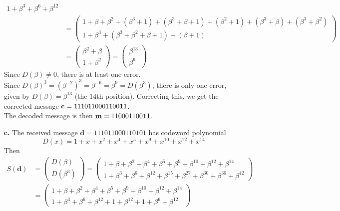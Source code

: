\documentclass[11pt]{article}
\renewcommand{\vec}[1]{\mathbf{#1}}
\newcommand{\vc}[1]{\begin{pmatrix}#1\end{pmatrix}}
\begin{document}
\begin{itemize}
\begin{align*}
{                                      1 + \beta^3 + \beta^6 + \beta^{12}}\\
                               &= \vc{1 + \beta   + \beta^2 + (\beta^3+1)+ (\beta^3+\beta+1) + (\beta^2+1) + (\beta^3 + \beta) + (\beta^3 + \beta^2)\\
                                      1 + \beta^3 + (\beta^3+\beta^2+\beta+1) + (\beta+1)}\\
                               &= \vc{\beta^2+\beta\\
                                      1 + \beta^2}
                                = \vc{\beta^{13}\\
                                      \beta^9}
                   \end{align*}
                   Since $D(\beta)\neq 0$, there is at least one error.\\
                   Since $D(\beta)^3 = (\beta^{-2})^3 = \beta^{-6} = \beta^9 = D(\beta^3)$,
                   there is only one error, given by $D(\beta) = \beta^{13}$ (the 14th position).
                   Correcting this, we get the corrected message
                   $\vec{c} = \text{1110110001100\textbf{1}1}$.\\
                   The decoded  message is then $\vec{m} = \text{110001100\textbf{1}1}$.
      \item[{\bf c.}] The received message      $\vec{d} = \text{111011000110101}$
                   has codeword polynomial
                   \[
                     D(x) = 1 + x + x^2 + x^4 + x^5 + x^9 + x^{10} + x^{12} + x^{14}
                   \]
                   Then
                   \begin{align*}
                     S(\vec{d})&= \vc{D(\beta)\\
                                      D(\beta^3)}
                                = \vc{1 + \beta   + \beta^2 + \beta^4    + \beta^5    + \beta^9    + \beta^{10} + \beta^{12} + \beta^{14} \\
                                      1 + \beta^3 + \beta^6 + \beta^{12} + \beta^{15} + \beta^{27} + \beta^{30} + \beta^{36} + \beta^{42}}\\
                               &= \vc{1 + \beta   + \beta^2 + \beta^4    + \beta^5    + \beta^9    + \beta^{10} + \beta^{12} + \beta^{14} \\
                                      1 + \beta^3 + \beta^6 + \beta^{12} +    1       + \beta^{12} +    1       + \beta^6 + \beta^{12}}\\

\end{align*}
\end{itemize}
\end{document}
